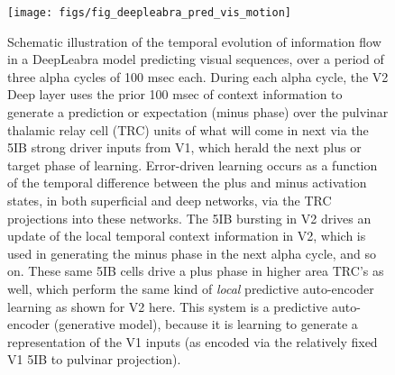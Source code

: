 \documentclass[11pt,twoside]{article}
\newif\myifpdf
\begin{document}
\begin{figure}
  \centering\texttt{[image: figs/fig\_deepleabra\_pred\_vis\_motion]}
  \caption{\footnotesize Schematic illustration of the temporal evolution of information flow in a DeepLeabra model predicting visual sequences, over a period of three alpha cycles of 100 msec each.  During each alpha cycle, the V2 Deep layer uses the prior 100 msec of context information to generate a prediction or expectation (minus phase) over the pulvinar thalamic relay cell (TRC) units of what will come in next via the 5IB strong driver inputs from V1, which herald the next plus or target phase of learning.  Error-driven learning occurs as a function of the temporal difference between the plus and minus activation states, in both superficial and deep networks, via the TRC projections into these networks.  The 5IB bursting in V2 drives an update of the local temporal context information in V2, which is used in generating the minus phase in the next alpha cycle, and so on.  These same 5IB cells drive a plus phase in higher area TRC's as well, which perform the same kind of {\em local} predictive auto-encoder learning as shown for V2 here.  This system is a predictive auto-encoder (generative model), because it is learning to generate a representation of the V1 inputs (as encoded via the relatively fixed V1 5IB to pulvinar projection).}
  \label{fig.pred_vis_motion}
\end{figure}
\end{document}
